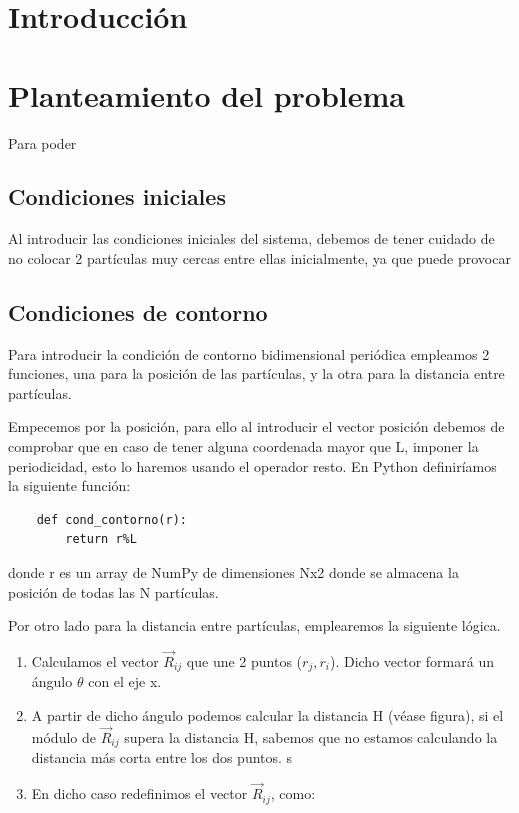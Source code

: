 \documentclass[11pt, twoside]{article} %
\begin{document}
\pagestyle{main}

\section{Introducción}

\section{Planteamiento del problema}

Para poder 

\subsection{Condiciones iniciales}
Al introducir las condiciones iniciales del sistema, debemos de tener cuidado de
no colocar 2 partículas muy cercas entre ellas inicialmente, ya que puede provocar


\subsection{Condiciones de contorno}

Para introducir la condición de contorno bidimensional periódica empleamos 
2 funciones, una para la posición de las partículas, y la otra para la 
distancia entre partículas.

Empecemos por la posición, para ello al introducir el vector posición 
debemos de comprobar que en caso de tener alguna coordenada mayor que L,
imponer la periodicidad, esto lo haremos usando el operador resto. En Python
definiríamos la siguiente función:

\begin{verbatim}
    def cond_contorno(r):
        return r%L
\end{verbatim}

donde r es un array de NumPy de dimensiones Nx2 donde se almacena la 
posición de todas las N partículas. 

\vspace{3mm}

Por otro lado para la distancia entre partículas, emplearemos la siguiente
lógica.
\begin{enumerate}
    \item Calculamos el vector $\vec{R}_{ij}$ que une 2 puntos ($r_j, r_i$).
         Dicho vector formará un ángulo $\theta$ con el eje x.
    \item A partir de dicho ángulo podemos calcular la distancia H (véase
        figura), si el módulo de $\vec{R}_{ij}$ supera la distancia H, sabemos 
        que no estamos calculando la distancia más corta entre los dos 
        puntos.
s    \item En dicho caso redefinimos el vector $\vec{R}_{ij}$, como:
\end{enumerate}
\end{document}
